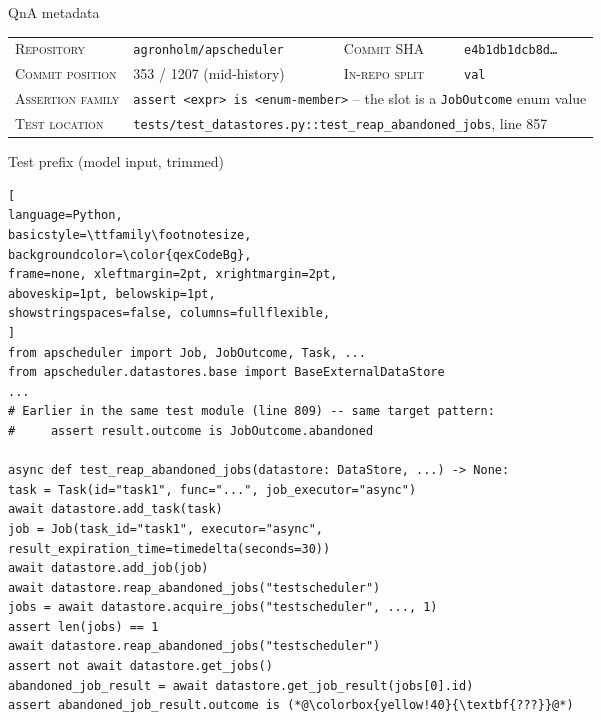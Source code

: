 \documentclass[11pt]{article}
\begin{document}
\begin{figure}[!htbp]
\begin{center}
\begin{tcolorbox}[
enhanced,
colback=white, colframe=qexHead, coltitle=white,
fonttitle=\bfseries,
title={Detailed qualitative example: \texttt{agronholm/apscheduler} (IR test, commit-derived)},
arc=3pt, boxrule=0.6pt,
top=3pt, bottom=3pt, left=6pt, right=6pt,
]

\begin{qexsection}{QnA metadata}
\footnotesize
\begin{tabular}{@{}l@{\;\;}l@{\hskip 14pt}l@{\;\;}l@{}}
\textsc{Repository}      & \texttt{agronholm/apscheduler}              & \textsc{Commit SHA}        & \texttt{e4b1db1dcb8d\ldots} \\
\textsc{Commit position} & 353 / 1207 (mid-history)                    & \textsc{In-repo split}     & \texttt{val} \\
\textsc{Assertion family} & \multicolumn{3}{l}{\texttt{assert <expr> is <enum-member>} -- the slot is a \texttt{JobOutcome} enum value} \\
\textsc{Test location}   & \multicolumn{3}{l}{\texttt{tests/test\_datastores.py::test\_reap\_abandoned\_jobs}, line 857} \\
\end{tabular}
\end{qexsection}

\begin{qexsection}{Test prefix (model input, trimmed)}
\begin{lstlisting}[
language=Python,
basicstyle=\ttfamily\footnotesize,
backgroundcolor=\color{qexCodeBg},
frame=none, xleftmargin=2pt, xrightmargin=2pt,
aboveskip=1pt, belowskip=1pt,
showstringspaces=false, columns=fullflexible,
]
from apscheduler import Job, JobOutcome, Task, ...
from apscheduler.datastores.base import BaseExternalDataStore
...
# Earlier in the same test module (line 809) -- same target pattern:
#     assert result.outcome is JobOutcome.abandoned

async def test_reap_abandoned_jobs(datastore: DataStore, ...) -> None:
task = Task(id="task1", func="...", job_executor="async")
await datastore.add_task(task)
job = Job(task_id="task1", executor="async",
result_expiration_time=timedelta(seconds=30))
await datastore.add_job(job)
await datastore.reap_abandoned_jobs("testscheduler")
jobs = await datastore.acquire_jobs("testscheduler", ..., 1)
assert len(jobs) == 1
await datastore.reap_abandoned_jobs("testscheduler")
assert not await datastore.get_jobs()
abandoned_job_result = await datastore.get_job_result(jobs[0].id)
assert abandoned_job_result.outcome is (*@\colorbox{yellow!40}{\textbf{???}}@*)
\end{lstlisting}
\end{qexsection}


\end{tcolorbox}
\end{center}
\end{figure}
\end{document}
